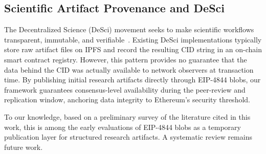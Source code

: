 \subsection{Scientific Artifact Provenance and DeSci}
The Decentralized Science (DeSci) movement seeks to make scientific workflows transparent, immutable, and verifiable~\cite{wilkinson2016fair,priem2022openalex}. Existing DeSci implementations typically store raw artifact files on IPFS and record the resulting CID string in an on-chain smart contract registry. However, this pattern provides no guarantee that the data behind the CID was actually available to network observers at transaction time. By publishing initial research artifacts directly through EIP-4844 blobs, our framework guarantees consensus-level availability during the peer-review and replication window, anchoring data integrity to Ethereum's security threshold.

To our knowledge, based on a preliminary survey of the literature cited in this work, this is among the early evaluations of EIP-4844 blobs as a temporary publication layer for structured research artifacts. A systematic review remains future work.
